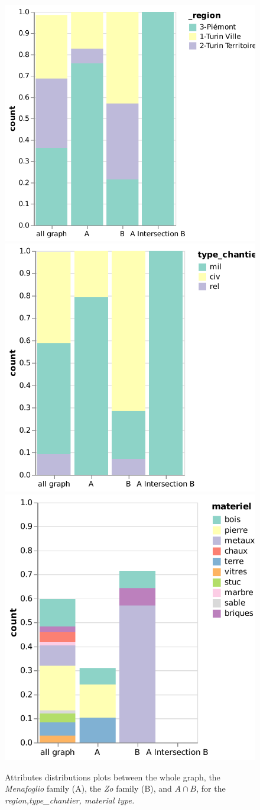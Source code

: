 \begin{figure}[h]
    \centering


    \includegraphics[width=0.3\linewidth]{static/figures/ComBiNet/OriginalPaperFigures/CGF/MenaZoPlots/v2/region.pdf}
     \includegraphics[width=0.3\linewidth]{static/figures/ComBiNet/OriginalPaperFigures/CGF/MenaZoPlots/v2/type-chantier.pdf}
     \includegraphics[width=0.3\linewidth]{static/figures/ComBiNet/OriginalPaperFigures/CGF/MenaZoPlots/v2/materiel.pdf}

    \caption{Attributes distributions plots between the whole graph, the \textit{Menafoglio} family (A), the \textit{Zo} family (B), and $A\cap B$, for the \textit{region,type\_chantier,  material type.}
    \label{fig:useCasePascal}}
\end{figure}

